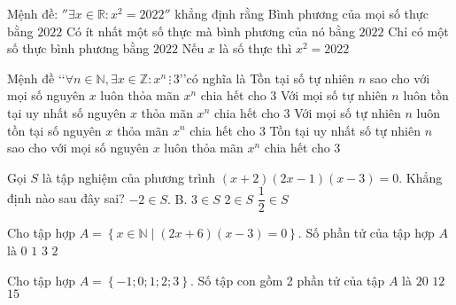 \begin{ex}
	Mệnh đề: $''\exists x\in \mathbb{R}\colon x^2=2022''$ khẳng định rằng
	\choice
	{Bình phương của mọi số thực bằng $2022$}
	{\True Có ít nhất một số thực mà bình phương của nó bằng $2022$}
	{Chỉ có một số thực bình phương bằng $2022$}
	{Nếu ${x}$ là số thực thì $x^2=2022$}
\end{ex}
\begin{ex}
	Mệnh đề \lq\lq $\forall n\in \mathbb{N},\exists x\in \mathbb{Z}\colon x^n\, \vdots\, 3$\rq\rq có nghĩa là
	\choice
	{Tồn tại số tự nhiên $n$ sao cho với mọi số nguyên $x$ luôn thỏa mãn $x^n$ chia hết cho 3}
	{Với mọi số tự nhiên $n$ luôn tồn tại uy nhất số nguyên $x$ thỏa mãn $x^n$ chia hết cho 3}
	{\True Với mọi số tự nhiên $n$ luôn tồn tại số nguyên $x$ thỏa mãn $x^n$ chia hết cho 3}
	{Tồn tại uy nhất số tự nhiên $n$ sao cho với mọi số nguyên $x$ luôn thỏa mãn $x^n$ chia hết cho 3}
\end{ex}
\begin{ex}
	Gọi $S$ là tập nghiệm của phương trình $(x+2)(2x-1)(x-3)=0$. Khẳng định nào sau đây sai?
	\choice
	{$-2\in S$. B. $3\in S$}
	{\True $2\in S$}
	{$\dfrac{1}{2}\in S$}
\end{ex}
\begin{ex}
	Cho tập hợp $A=\left\{ x\in \mathbb{N}\mid (2x+6)(x-3)=0 \right\}$. Số phần tử của tập hợp $A$ là
	\choice
	{$0$}
	{\True $1$}
	{$3$}
	{$2$}
\end{ex}
\begin{ex}
	Cho tập hợp $A=\left\{ -1;0;1;2;3 \right\}$. Số tập con gồm 2 phần tử của tập $A$ là
	\choice
	{$20$}
	{}
	{$12$}
	{$15$}
\end{ex}
